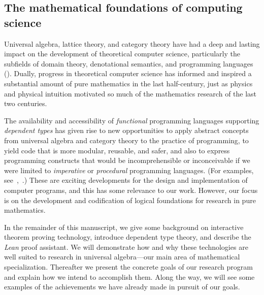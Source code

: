 \documentclass[12pt]{amsart}  %
\begin{document}
\subsection{The mathematical foundations of computing science}
Universal algebra, lattice theory, and category theory have had a deep and lasting impact on the development of theoretical computer science,  particularly the subfields of domain theory, denotational semantics, and programming languages (\pl). Dually, progress in theoretical computer science has informed and inspired a substantial amount of pure mathematics in the last half-century, just as physics and physical intuition motivated so much of the mathematics research of the last two centuries.


The availability and accessibility of \emph{functional} programming languages supporting \emph{dependent types} has given rise to new opportunities to apply abstract concepts from universal algebra and category theory to the practice of programming, to yield code that is more modular, reusable, and safer, and also to express programming constructs that would be incomprehensible or inconceivable if we were limited to \emph{imperative} or  \emph{procedural} programming languages. 
(For examples, see~\cite{baueroplss:2018},~\cite[esp.~Chs.~5,~10]{chiusano:2014}.) These are exciting developments for the design and implementation of computer programs, and this has some relevance to our work.  However, our focus is on the development and codification of logical foundations for research in pure mathematics.
 
In the remainder of this manuscript, we give some background on interactive theorem proving technology, introduce dependent type theory, and describe the \emph{Lean} proof assistant. We will demonstrate how and why these technologies are well suited to research in universal algebra---our main area of mathematical specialization. Thereafter we present the concrete goals of our research program and explain how we intend to accomplish them. Along the way, we will see some examples of the achievements we have already made in pursuit of our goals.
\end{document}
